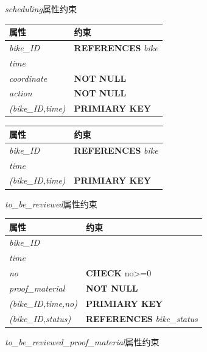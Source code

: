 \begin{figure}[!htp]
    \begin{minipage}{0.5\textwidth}
      \centering
      \caption{\textit{scheduling}属性约束}
      \label{contraint:scheduling}
      \begin{tabular}{ll}\toprule
        属性&约束\\\midrule
       \textit{bike\_ID}&\textbf{REFERENCES} \textit{bike}\\
       \textit{time}&\\
       \textit{coordinate}&\textbf{NOT NULL}\\
       \textit{action}&\textbf{NOT NULL}\\
       \textit{(bike\_ID,time)}&\textbf{PRIMIARY KEY}\\
       \bottomrule
      \end{tabular}
    \end{minipage}\hfill
    \begin{minipage}{0.5\textwidth}
      \centering
      \caption{\textit{to\_be\_reviewed}属性约束}
      \label{contraint:tobereviewed}
      \begin{tabular}{ll}\toprule
        属性&约束\\\midrule
       \textit{bike\_ID}&\textbf{REFERENCES} \textit{bike}\\
       \textit{time}&\\
       \textit{(bike\_ID,time)}&\textbf{PRIMIARY KEY}\\
       \bottomrule
      \end{tabular}
    \end{minipage}\hfill
\end{figure}


\begin{figure}[!htp]

      \centering
      \caption{\textit{to\_be\_reviewed\_proof\_material}属性约束}
      \label{contraint:tobereviewedproofmaterial}
      \begin{tabular}{ll}\toprule
        属性&约束\\\midrule
       \textit{bike\_ID}&\\
       \textit{time}&\\
       \textit{no}&\textbf{CHECK} no>=0\\
       \textit{proof\_material}&\textbf{NOT NULL}\\
       \textit{(bike\_ID,time,no)}&\textbf{PRIMIARY KEY}\\
       \textit{(bike\_ID,status)}&\textbf{REFERENCES} \textit{bike\_status}\\
       \bottomrule
      \end{tabular}

\end{figure}

